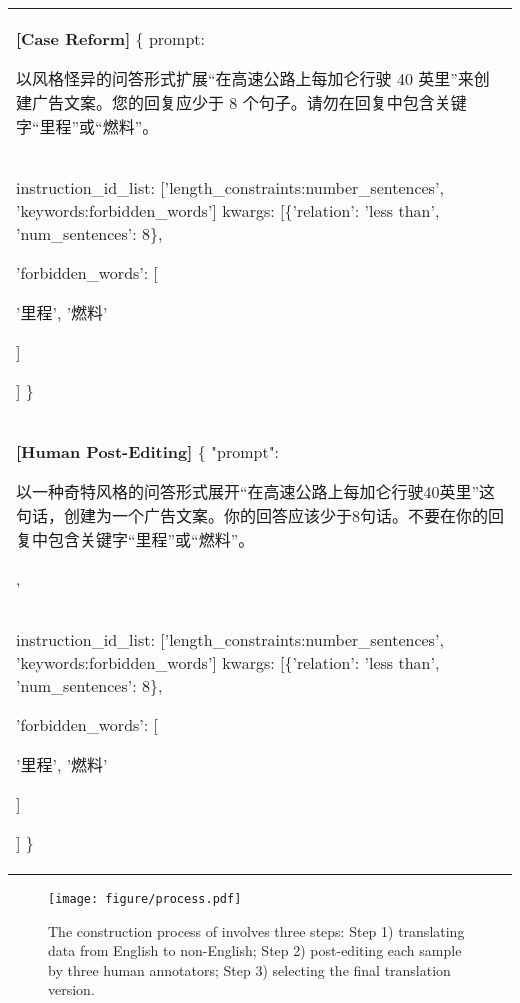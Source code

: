 \begin{table}[t!]
\begin{tabular}{|p{7.8cm}|}
        \hline
    
        \textbf{[Case Reform]} \{
        prompt: \begin{CJK}{UTF8}{gbsn}以风格怪异的问答形式扩展“在高速公路上每加仑行驶 40 英里”来创建广告文案。您的回复应少于 8 个句子。请勿在回复中包含关键字“里程”或“燃料”。\end{CJK}
        \\
instruction\_id\_list: ['length\_constraints:number\_sentences', 'keywords:forbidden\_words']
kwargs: [\{'relation': 'less than', 'num\_sentences': 8\}, {'forbidden\_words': [\begin{CJK}{UTF8}{gbsn}'里程', '燃料'\end{CJK}]}] \} \\ 
        \hline
        \textbf{[Human Post-Editing]} \{
        "prompt": \begin{CJK}{UTF8}{gbsn}以一种奇特风格的问答形式展开“在高速公路上每加仑行驶40英里”这句话，创建为一个广告文案。你的回答应该少于8句话。不要在你的回复中包含关键字“里程”或“燃料”。\end{CJK},\\ 
        instruction\_id\_list: ['length\_constraints:number\_sentences', 'keywords:forbidden\_words']
kwargs: [\{'relation': 'less than', 'num\_sentences': 8\}, {'forbidden\_words': [\begin{CJK}{UTF8}{gbsn}'里程', '燃料'\end{CJK}]}] \} \\ 
        \hline
    \end{tabular}
\end{table}
\endgroup


\begin{figure*}[htbp]
    \centering
    \texttt{[image: figure/process.pdf]}
    \caption{The construction process of \name involves three steps: Step 1) translating data from English to non-English; Step 2) post-editing each sample by three human annotators; Step 3) selecting the final translation version.}
    \label{fig:overview}
    \vskip -0.2in
\end{figure*}



